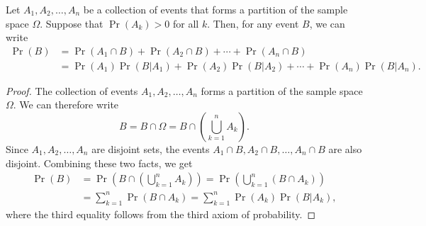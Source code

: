 \begin{theorem} \label{theorem:TotalProbability} 
Let $A_1, A_2, \ldots, A_n$ be a collection of events that forms a partition of the sample space $\Omega$.
Suppose that $\Pr (A_k) > 0$ for all $k$.
Then, for any event $B$, we can write
\begin{equation*}
\begin{split}
\Pr (B) &= \Pr (A_1 \cap B) + \Pr (A_2 \cap B) + \cdots + \Pr (A_n \cap B) \\
&= \Pr (A_1) \Pr (B | A_1) + \Pr (A_2) \Pr (B | A_2) + \cdots + \Pr (A_n) \Pr (B | A_n ) .
\end{split}
\end{equation*}
\end{theorem}
\begin{proof}
The collection of events $A_1, A_2, \ldots, A_n$ forms a partition of the sample space $\Omega$.
We can therefore write
\begin{equation*}
B = B \cap \Omega = B \cap \left( \bigcup_{k=1}^n A_k \right) .
\end{equation*}
Since $A_1, A_2, \ldots, A_n$ are disjoint sets, the events $A_1 \cap B, A_2 \cap B, \ldots, A_n \cap B$ are also disjoint.
Combining these two facts, we get
\begin{equation*}
\begin{split}
\Pr (B)
&= \Pr \left( B \cap \left( \bigcup_{k=1}^n A_k \right) \right)
= \Pr \left( \bigcup_{k=1}^n (B \cap A_k) \right) \\
&= \sum_{k=1}^n \Pr \left( B \cap A_k \right)
= \sum_{k=1}^n \Pr (A_k) \Pr \left( B | A_k \right) ,
\end{split}
\end{equation*}
where the third equality follows from the third axiom of probability.
\end{proof}

